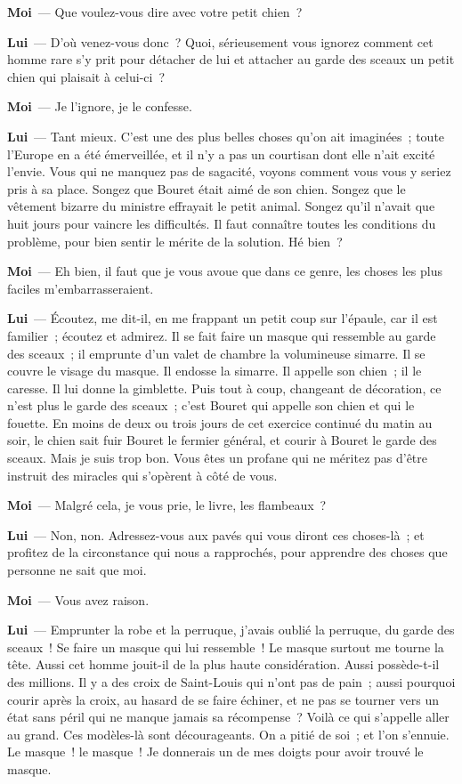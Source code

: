 \documentclass[french,twoside]{book} %
\newcommand{\labelchar}[1]{\textbf{\color{rubric} #1}}
\begin{document}
\labelchar{Moi} — Que voulez-vous dire avec votre petit chien ?\par
\labelchar{Lui} — D’où venez-vous donc ? Quoi, sérieusement vous ignorez comment cet homme rare s’y prit pour détacher de lui et attacher au garde des sceaux un petit chien qui plaisait à celui-ci ?\par
\labelchar{Moi} — Je l’ignore, je le confesse.\par
\labelchar{Lui} — Tant mieux. C’est une des plus belles choses qu’on ait imaginées ; toute l’Europe en a été émerveillée, et il n’y a pas un courtisan dont elle n’ait excité l’envie. Vous qui ne manquez pas de sagacité, voyons comment vous vous y seriez pris à sa place. Songez que Bouret était aimé de son chien. Songez que le vêtement bizarre du ministre effrayait le petit animal. Songez qu’il n’avait que huit jours pour vaincre les difficultés. Il faut connaître toutes les conditions du problème, pour bien sentir le mérite de la solution. Hé bien ?\par
\labelchar{Moi} — Eh bien, il faut que je vous avoue que dans ce genre, les choses les plus faciles m’embarrasseraient.\par
\labelchar{Lui} — Écoutez, me dit-il, en me frappant un petit coup sur l’épaule, car il est familier ; écoutez et admirez. Il se fait faire un masque qui ressemble au garde des sceaux ; il emprunte d’un valet de chambre la volumineuse simarre. Il se couvre le visage du masque. Il endosse la simarre. Il appelle son chien ; il le caresse. Il lui donne la gimblette. Puis tout à coup, changeant de décoration, ce n’est plus le garde des sceaux ; c’est Bouret qui appelle son chien et qui le fouette. En moins de deux ou trois jours de cet exercice continué du matin au soir, le chien sait fuir Bouret le fermier général, et courir à Bouret le garde des sceaux. Mais je suis trop bon. Vous êtes un profane qui ne méritez pas d’être instruit des miracles qui s’opèrent à côté de vous.\par
\labelchar{Moi} — Malgré cela, je vous prie, le livre, les flambeaux ?\par
\labelchar{Lui} — Non, non. Adressez-vous aux pavés qui vous diront ces choses-là ; et profitez de la circonstance qui nous a rapprochés, pour apprendre des choses que personne ne sait que moi.\par
\labelchar{Moi} — Vous avez raison.\par
\labelchar{Lui} — Emprunter la robe et la perruque, j’avais oublié la perruque, du garde des sceaux ! Se faire un masque qui lui ressemble ! Le masque surtout me tourne la tête. Aussi cet homme jouit-il de la plus haute considération. Aussi possède-t-il des millions. Il y a des croix de Saint-Louis qui n’ont pas de pain ; aussi pourquoi courir après la croix, au hasard de se faire échiner, et ne pas se tourner vers un état sans péril qui ne manque jamais sa récompense ? Voilà ce qui s’appelle aller au grand. Ces modèles-là sont décourageants. On a pitié de soi ; et l’on s’ennuie. Le masque ! le masque ! Je donnerais un de mes doigts pour avoir trouvé le masque.\par
\end{document}
